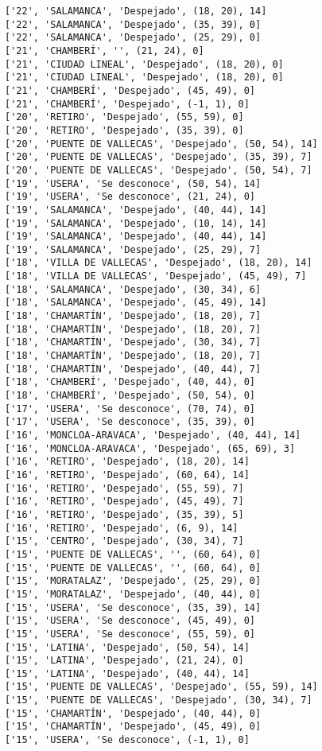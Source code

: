 \documentclass[11pt]{article}
\begin{document}
\begin{Verbatim}[commandchars=\\\{\}]
['22', 'SALAMANCA', 'Despejado', (18, 20), 14]
['22', 'SALAMANCA', 'Despejado', (35, 39), 0]
['22', 'SALAMANCA', 'Despejado', (25, 29), 0]
['21', 'CHAMBERÍ', '', (21, 24), 0]
['21', 'CIUDAD LINEAL', 'Despejado', (18, 20), 0]
['21', 'CIUDAD LINEAL', 'Despejado', (18, 20), 0]
['21', 'CHAMBERÍ', 'Despejado', (45, 49), 0]
['21', 'CHAMBERÍ', 'Despejado', (-1, 1), 0]
['20', 'RETIRO', 'Despejado', (55, 59), 0]
['20', 'RETIRO', 'Despejado', (35, 39), 0]
['20', 'PUENTE DE VALLECAS', 'Despejado', (50, 54), 14]
['20', 'PUENTE DE VALLECAS', 'Despejado', (35, 39), 7]
['20', 'PUENTE DE VALLECAS', 'Despejado', (50, 54), 7]
['19', 'USERA', 'Se desconoce', (50, 54), 14]
['19', 'USERA', 'Se desconoce', (21, 24), 0]
['19', 'SALAMANCA', 'Despejado', (40, 44), 14]
['19', 'SALAMANCA', 'Despejado', (10, 14), 14]
['19', 'SALAMANCA', 'Despejado', (40, 44), 14]
['19', 'SALAMANCA', 'Despejado', (25, 29), 7]
['18', 'VILLA DE VALLECAS', 'Despejado', (18, 20), 14]
['18', 'VILLA DE VALLECAS', 'Despejado', (45, 49), 7]
['18', 'SALAMANCA', 'Despejado', (30, 34), 6]
['18', 'SALAMANCA', 'Despejado', (45, 49), 14]
['18', 'CHAMARTÍN', 'Despejado', (18, 20), 7]
['18', 'CHAMARTÍN', 'Despejado', (18, 20), 7]
['18', 'CHAMARTÍN', 'Despejado', (30, 34), 7]
['18', 'CHAMARTÍN', 'Despejado', (18, 20), 7]
['18', 'CHAMARTÍN', 'Despejado', (40, 44), 7]
['18', 'CHAMBERÍ', 'Despejado', (40, 44), 0]
['18', 'CHAMBERÍ', 'Despejado', (50, 54), 0]
['17', 'USERA', 'Se desconoce', (70, 74), 0]
['17', 'USERA', 'Se desconoce', (35, 39), 0]
['16', 'MONCLOA-ARAVACA', 'Despejado', (40, 44), 14]
['16', 'MONCLOA-ARAVACA', 'Despejado', (65, 69), 3]
['16', 'RETIRO', 'Despejado', (18, 20), 14]
['16', 'RETIRO', 'Despejado', (60, 64), 14]
['16', 'RETIRO', 'Despejado', (55, 59), 7]
['16', 'RETIRO', 'Despejado', (45, 49), 7]
['16', 'RETIRO', 'Despejado', (35, 39), 5]
['16', 'RETIRO', 'Despejado', (6, 9), 14]
['15', 'CENTRO', 'Despejado', (30, 34), 7]
['15', 'PUENTE DE VALLECAS', '', (60, 64), 0]
['15', 'PUENTE DE VALLECAS', '', (60, 64), 0]
['15', 'MORATALAZ', 'Despejado', (25, 29), 0]
['15', 'MORATALAZ', 'Despejado', (40, 44), 0]
['15', 'USERA', 'Se desconoce', (35, 39), 14]
['15', 'USERA', 'Se desconoce', (45, 49), 0]
['15', 'USERA', 'Se desconoce', (55, 59), 0]
['15', 'LATINA', 'Despejado', (50, 54), 14]
['15', 'LATINA', 'Despejado', (21, 24), 0]
['15', 'LATINA', 'Despejado', (40, 44), 14]
['15', 'PUENTE DE VALLECAS', 'Despejado', (55, 59), 14]
['15', 'PUENTE DE VALLECAS', 'Despejado', (30, 34), 7]
['15', 'CHAMARTÍN', 'Despejado', (40, 44), 0]
['15', 'CHAMARTÍN', 'Despejado', (45, 49), 0]
['15', 'USERA', 'Se desconoce', (-1, 1), 0]

\end{Verbatim}
\end{document}
